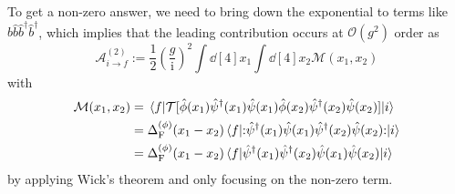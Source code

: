 \documentclass[a4paper,11pt]{article}
\begin{document}
	To get a non-zero answer, we need to bring down the exponential to terms like $\hat b \hat b \hat b^{\dagger} \hat b^{\dagger}$, which implies that the leading contribution occurs at $\mathcal{O}(g^2)$ order as 
	\[
		\mathcal{A}_{i \to f}^{(2)} := \frac{1}{2} \left( \frac{g}{\mathrm{i}} \right)^2 \int \dd[4]{x_1} \int \dd[4]{x_2} \mathcal{M}(x_1,x_2)
	\]
	with
	\begin{align*}
		\mathcal{M}(x_1,x_2) & = \mel{f}{\mathcal{T}[\hat \phi(x_1) \hat \psi^{\dagger}(x_1) \hat \psi(x_1)\hat \phi(x_2) \hat \psi^{\dagger}(x_2) \hat \psi(x_2)]}{i}\\
		& = \Delta_\text{F}^{(\phi)}(x_1 - x_2) \mel{f}{:\mathrel{\hat \psi^{\dagger}(x_1)\hat \psi(x_1)\hat \psi^{\dagger}(x_2)\hat \psi(x_2)}:}{i}\\
		& = \Delta_\text{F}^{(\phi)}(x_1 - x_2) \mel{f}{\hat \psi^{\dagger}(x_1) \hat \psi^{\dagger}(x_2) \hat \psi(x_1)\hat \psi(x_2)}{i}
	\end{align*}
	by applying Wick's theorem and only focusing on the non-zero term.
	




	

	
\end{document}
